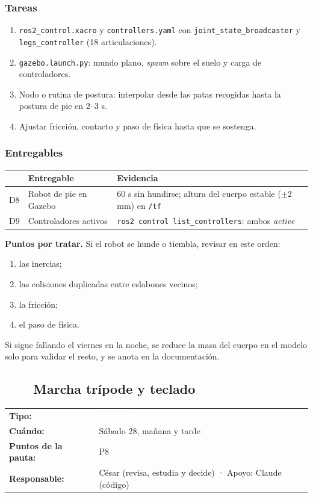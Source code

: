 \documentclass[11pt,a4paper]{article}
\makeatletter
\newcommand{\pill}[2]{{\setlength{\fboxsep}{1.6pt}\colorbox{#1}{\textcolor{white}{\footnotesize\bfseries\,#2\,}}}}
\newcommand{\Ec}{\pill{cControl}{E4}}
\newcommand{\ficha}[4]{%
  \begin{tabularx}{\linewidth}{@{}l Y@{}}
  \textbf{Tipo:} & \pill{#1}{#2}\\
  \textbf{Cuándo:} & #3\\
  \textbf{Puntos de la pauta:} & #4\\
  \textbf{Responsable:} & César (revisa, estudia y decide) · Apoyo: Claude (código)\\
  \end{tabularx}\par}
\makeatother
\begin{document}
\subsubsection{Tareas}
\begin{enumerate}[label=T\arabic*]
  \item \texttt{ros2\_control.xacro} y \texttt{controllers.yaml} con \texttt{joint\_state\_broadcaster} y \texttt{legs\_controller} (18 articulaciones).
  \item \texttt{gazebo.launch.py}: mundo plano, \emph{spawn} sobre el suelo y carga de controladores.
  \item Nodo o rutina de postura: interpolar desde las patas recogidas hasta la postura de pie en 2--3 s.
  \item Ajustar fricción, contacto y paso de física hasta que se sostenga.
\end{enumerate}

\subsubsection{Entregables}
\begin{tabularx}{\linewidth}{@{}l Y Y@{}}
\toprule \textbf{} & \textbf{Entregable} & \textbf{Evidencia}\\ \midrule
D8 & Robot de pie en Gazebo & 60 s sin hundirse; altura del cuerpo estable ($\pm 2$ mm) en \texttt{/tf}\\
D9 & Controladores activos & \texttt{ros2 control list\_controllers}: ambos \emph{active}\\
\bottomrule
\end{tabularx}

\textbf{Puntos por tratar.} Si el robot se hunde o tiembla, revisar en este orden:
\begin{enumerate}
  \item las inercias;
  \item las colisiones duplicadas entre eslabones vecinos;
  \item la fricción;
  \item el paso de física.
\end{enumerate}
Si sigue fallando el viernes en la noche, se reduce la masa del cuerpo en el modelo solo para validar el resto, y se anota en la documentación.

\subsection{\texorpdfstring{\Ec\ }{E4 }Marcha trípode y teclado}
\ficha{cControl}{Control}{Sábado 28, mañana y tarde}{P8}
\end{document}

